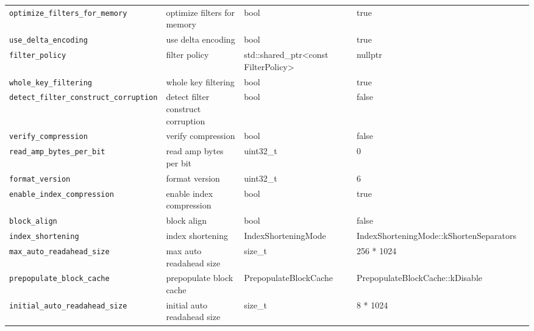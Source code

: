 {{\begin{longtable}{@{}p{3.4cm}p{5.0cm}p{3.6cm}p{2.5cm}p{2.6cm}@{}}
    \texttt{optimize\_filters\_for\_memory}
    & optimize filters for memory
    & bool
    & true
    & \\

    \texttt{use\_delta\_encoding}
    & use delta encoding
    & bool
    & true
    & \\

    \texttt{filter\_policy}
    & filter policy
    & std::shared\_ptr\textless{}const FilterPolicy\textgreater{}
    & nullptr
    & \\

    \texttt{whole\_key\_filtering}
    & whole key filtering
    & bool
    & true
    & \\

    \texttt{detect\_filter\_construct\_corruption}
    & detect filter construct corruption
    & bool
    & false
    & \\

    \texttt{verify\_compression}
    & verify compression
    & bool
    & false
    & \\

    \texttt{read\_amp\_bytes\_per\_bit}
    & read amp bytes per bit
    & uint32\_t
    & 0
    & \\

    \texttt{format\_version}
    & format version
    & uint32\_t
    & 6
    & \\

    \texttt{enable\_index\_compression}
    & enable index compression
    & bool
    & true
    & \\

    \texttt{block\_align}
    & block align
    & bool
    & false
    & \\

    \texttt{index\_shortening}
    & index shortening
    & IndexShorteningMode
    & IndexShorteningMode::kShortenSeparators
    & \\

    \texttt{max\_auto\_readahead\_size}
    & max auto readahead size
    & size\_t
    & 256 * 1024
    & \\

    \texttt{prepopulate\_block\_cache}
    & prepopulate block cache
    & PrepopulateBlockCache
    & PrepopulateBlockCache::kDisable
    & \\

    \texttt{initial\_auto\_readahead\_size}
    & initial auto readahead size
    & size\_t
    & 8 * 1024
    & \\


\end{longtable}}}

